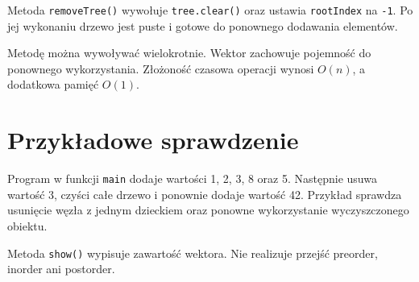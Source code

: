 \documentclass[11pt,a4paper]{article}
\begin{document}
Metoda \texttt{removeTree()} wywołuje \texttt{tree.clear()}
oraz ustawia \texttt{rootIndex} na \texttt{-1}.
Po jej wykonaniu drzewo jest puste i gotowe
do ponownego dodawania elementów.

Metodę można wywoływać wielokrotnie.
Wektor zachowuje pojemność do ponownego wykorzystania.
Złożoność czasowa operacji wynosi $O(n)$,
a dodatkowa pamięć $O(1)$.

\section{Przykładowe sprawdzenie}

Program w funkcji \texttt{main} dodaje wartości
1, 2, 3, 8 oraz 5. Następnie usuwa wartość 3,
czyści całe drzewo i ponownie dodaje wartość 42.
Przykład sprawdza usunięcie węzła z jednym dzieckiem
oraz ponowne wykorzystanie wyczyszczonego obiektu.

Metoda \texttt{show()} wypisuje zawartość wektora.
Nie realizuje przejść preorder, inorder ani postorder.
\end{document}
